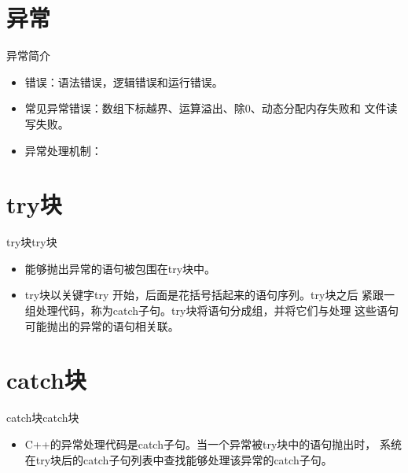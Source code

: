 \section[异常]{异常}\label{sec:chap10-sec01}
\begin{frame}[t, fragile]{异常}{简介}%
  \stretchon
  \begin{itemize}
  \item 错误：语法错误，逻辑错误和运行错误。
  \item 常见异常错误：数组下标越界、运算溢出、除0、动态分配内存失败和
    文件读写失败。
  \item 异常处理机制：
  \end{itemize}
  \stretchoff
\end{frame}

\section[try块]{try块}\label{sec:chap10-sec02}
\begin{frame}[t, fragile]{try块}{try块}%
  \stretchon
  \begin{itemize}
  \item 能够抛出异常的语句被包围在try块中。
  \item try块以关键字try 开始，后面是花括号括起来的语句序列。try块之后
    紧跟一组处理代码，称为catch子句。try块将语句分成组，并将它们与处理
    这些语句可能抛出的异常的语句相关联。    
  \end{itemize}
  \stretchoff
\end{frame}

\section[catch块]{catch块}\label{sec:chap10-sec03}
\begin{frame}[t, fragile]{catch块}{catch块}%
  \begin{itemize}
  \item C++的异常处理代码是catch子句。当一个异常被try块中的语句抛出时，
    系统在try块后的catch子句列表中查找能够处理该异常的catch子句。    
  \end{itemize}  
\end{frame}

